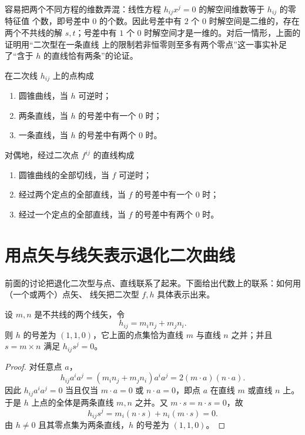 \begin{remark}
容易把两个不同方程的维数弄混：线性方程 $h_{ij}x^j=0$ 的解空间维数等于 $h_{ij}$ 的零特征值
个数，即号差中 $0$ 的个数。因此号差中有 $2$ 个 $0$ 时解空间是二维的，存在两个不共线的解
$s,t$；号差中有 $1$ 个 $0$ 时解空间才是一维的。对后一情形，上面的证明用“二次型在一条直线
上的限制若非恒零则至多有两个零点”这一事实补足了“含于 $h$ 的直线恰有两条”的论证。
\end{remark}

\begin{theorem}[退化二次型的几何意义]
在二次线 $h_{ij}$ 上的点构成
\begin{enumerate}[label=(\arabic*),leftmargin=2.4em]
\item 圆锥曲线，当 $h$ 可逆时；
\item 两条直线，当 $h$ 的号差中有一个 $0$ 时；
\item 一条直线，当 $h$ 的号差中有两个 $0$ 时。
\end{enumerate}
对偶地，经过二次点 $f^{ij}$ 的直线构成
\begin{enumerate}[label=(\arabic*'),leftmargin=2.6em]
\item 圆锥曲线的全部切线，当 $f$ 可逆时；
\item 经过两个定点的全部直线，当 $f$ 的号差中有一个 $0$ 时；
\item 经过一个定点的全部直线，当 $f$ 的号差中有两个 $0$ 时。
\end{enumerate}
\end{theorem}

\section{用点矢与线矢表示退化二次曲线}

前面的讨论把退化二次型与点、直线联系了起来。下面给出代数上的联系：如何用（一个或两个）点矢、
线矢把二次型 $f,h$ 具体表示出来。

\begin{proposition}[两个线矢的对称积]
设 $m,n$ 是不共线的两个线矢，令
\[
h_{ij}=m_in_j+m_jn_i.
\]
则 $h$ 的号差为 $(1,1,0)$，它上面的点集恰为直线 $m$ 与直线 $n$ 之并；并且
$s=m\times n$ 满足 $h_{ij}s^j=0$。
\end{proposition}

\begin{proof}
对任意点 $a$，
\[
h_{ij}a^ia^j=(m_in_j+m_jn_i)a^ia^j=2(m\cdot a)(n\cdot a).
\]
因此 $h_{ij}a^ia^j=0$ 当且仅当 $m\cdot a=0$ 或 $n\cdot a=0$，即点 $a$ 在直线 $m$ 或直线 $n$ 上。
于是 $h$ 上点的全体是两条直线 $m,n$ 之并。又 $m\cdot s=n\cdot s=0$，故
\[
h_{ij}s^j=m_i(n\cdot s)+n_i(m\cdot s)=0 .
\]
由 $h\neq0$ 且其零点集为两条直线，$h$ 的号差为 $(1,1,0)$。
\end{proof}

